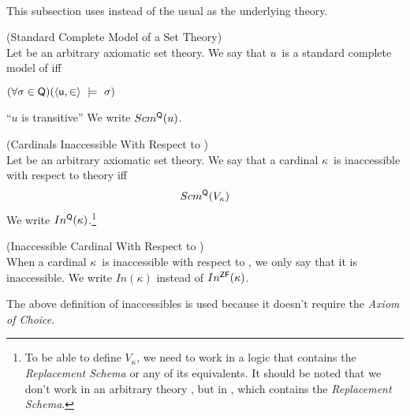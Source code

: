 
\

This subsection uses  instead of the usual  as the underlying theory. %

\begin{definition}{(Standard Complete Model of a Set Theory)}\label{def:scm_q}\\
Let  be an arbitrary axiomatic set theory.
We say that $u$ is a standard complete model of  iff
\bce[(i)]
\item $(\forall \sigma \in \sf{Q})(\langle u, \in \rangle~\models~\sigma)$
\item ``$u$ is transitive''
\ece 
We write $Scm^{\sf{Q}}(u)$.
\end{definition}

\begin{definition}{(Cardinals Inaccessible With Respect to )}\label{def:levy_inaccessible_q}\\
Let  be an arbitrary axiomatic set theory. We say that a cardinal $\kappa$ is inaccessible with respect to theory  iff
\begin{equation}
Scm^{\sf{Q}}(V_\kappa)
\end{equation}
We write $In^{\sf{Q}}(\kappa)$.\footnote{To be able to define $V_\kappa$, we need to work in a logic that contains the \emph{Replacement Schema} or any of its equivalents. It should be noted that we don't work in an arbitrary theory , but in , which contains the \emph{Replacement Schema}. 
}
\end{definition}

\begin{definition}{(Inaccessible Cardinal With Respect to )}\label{def:levy_inaccessible}\\
When a cardinal $\kappa$ is inaccessible with respect to , we only say that it is inaccessible. We write $In(\kappa)$ instead of $In^{\sf{ZF}}(\kappa)$.
\end{definition}
The above definition of inaccessibles is used because it doesn't require the \emph{Axiom of Choice}.

